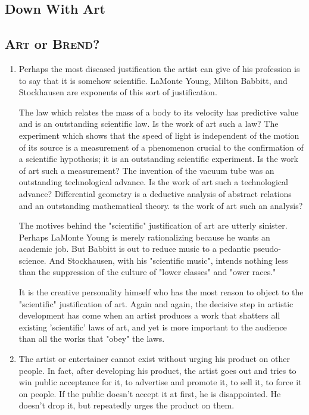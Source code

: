 \documentclass[10pt,twoside]{memoir}
\begin{document}
\begin{enumerate}
{\chapter{Down With Art}

\section{\textsc{Art} or \textsc{Brend}?}

\begin{enumerate}
\item Perhaps the most diseased justification the artist can give of his profession 
is to say that it is somehow scientific. LaMonte Young, Milton Babbitt, and 
Stockhausen are exponents of this sort of justification. 

The law which relates the mass of a body to its velocity has predictive value 
and is an outstanding scientific law. Is the work of art such a law? The 
experiment which shows that the speed of light is independent of the motion 
of its source is a measurement of a phenomenon crucial to the confirmation of 
a scientific hypothesis; it is an outstanding scientific experiment. Is the work 
of art such a measurement? The invention of the vacuum tube was an 
outstanding technological advance. Is the work of art such a technological 
advance? Differential geometry is a deductive analysis of abstract relations 
and an outstanding mathematical theory. ts the work of art such an 
analysis? 

The motives behind the "scientific" justification of art are utterly sinister. 
Perhaps LaMonte Young is merely rationalizing because he wants an 
academic job. But Babbitt is out to reduce music to a pedantic 
pseudo-science. And Stockhausen, with his "scientific music", intends 
nothing less than the suppression of the culture of "lower classes" and 
"ower races." 

It is the creative personality himself who has the most reason to object to 
the "scientific" justification of art. Again and again, the decisive step in 
artistic development has come when an artist produces a work that shatters 
all existing 'scientific' laws of art, and yet is more important to the 
audience than all the works that "obey" the laws. 

\item The artist or entertainer cannot exist without urging his product on other 
people. In fact, after developing his product, the artist goes out and tries to 
win public acceptance for it, to advertise and promote it, to sell it, to force it 
on people. If the public doesn't accept it at first, he is disappointed. He 
doesn't drop it, but repeatedly urges the product on them. 


\end{enumerate}}
\end{enumerate}
\end{document}
